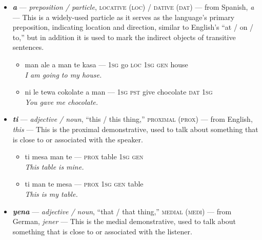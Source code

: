 \documentclass[a4paper, titlepage]{article}
\begin{document}
\begin{itemize}
\begin{itemize}
		\item ta ni palu-hase kau kau  — \textsc{pl-2} milk-\textsc{vb} cow\textasciitilde{}\textsc{pl} \\\textit{You all are all milking the cows.}
		\item man le hase ni tewa pensi a ye — \textsc{1sg pst caus} \textsc{2sg} give pencil \textsc{dat 3sg} \\\textit{I made you give the pencil to her.}
		\item man le sahin-hase ni te ca — \textsc{1sg pst} hot-\textsc{vb} \textsc{2sg gen} tea \\\textit{I warmed-up your tea.}
	\end{itemize}
	\item \textbf{\textit{a}} — \textit{preposition / particle}, \textsc{locative (loc) / dative (dat)} — from Spanish, \textit{a} — This is a widely-used particle as it serves as the language's primary preposition, indicating location and direction, similar to English's ``at / on / to,'' but in addition it is used to mark the indirect objects of transitive sentences.
	\begin{itemize}
		\item man ale a man te kasa — \textsc{1sg} go \textsc{loc 1sg gen} house \\\textit{I am going to my house.}
		\item ni le tewa cokolate a man — \textsc{1sg pst} give chocolate \textsc{dat 1sg} \\\textit{You gave me chocolate.}
	\end{itemize}
	\item \textbf{\textit{ti}} — \textit{adjective / noun}, ``this / this thing,'' \textsc{proximal (prox)} — from English, \textit{this} — This is the proximal demonstrative, used to talk about something that is close to or associated with the speaker.
	\begin{itemize}
		\item ti mesa man te — \textsc{prox} table \textsc{1sg gen} \\\textit{This table is mine.}
		\item ti man te mesa — \textsc{prox 1sg gen} table \\\textit{This is my table.}
	\end{itemize}
	\item \textbf{\textit{yena}} — \textit{adjective / noun}, ``that / that thing,'' \textsc{medial (medi)}  — from German, \textit{jener} — This is the medial demonstrative, used to talk about something that is close to or associated with the listener.

\end{itemize}
\end{document}
